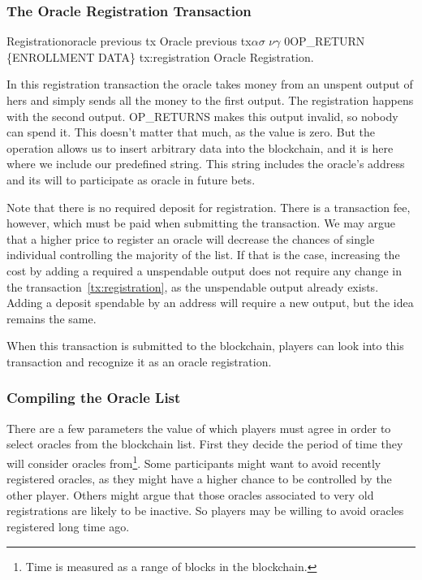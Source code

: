 \subsubsection{The Oracle Registration Transaction}

\transaction
    {Registration}{oracle previous tx}
      {Oracle previous tx}{$\alpha$}{$\sigma$}
      \stopinputs
      {$\nu$}{$\gamma$}
      {$0$}{OP\_RETURN \{ENROLLMENT DATA\}}
      \stopoutputs
      {tx:registration}
      {Oracle Registration.}

In this registration transaction the oracle takes money from an unspent output
  of hers and simply sends all the money to the first output.
The registration happens with the second output. OP\_RETURNS makes this output
  invalid, so nobody can spend it.
This doesn't matter that much, as the value is zero.
But the operation allows us to insert arbitrary data into the blockchain, and it
  is here where we include our predefined string. This string includes the
  oracle's address and its will to participate as oracle in future bets.

Note that there is no required deposit for registration. There is a
  transaction fee, however, which must be paid when submitting the transaction.
We may argue that a higher price to register an oracle will decrease the
  chances of single individual controlling the majority of the list.
If that is the case, increasing the cost by adding a required a unspendable
output does not require any change in the transaction~\ref{tx:registration},
  as the unspendable output already exists.
Adding a deposit spendable by an address will require a new output, but the
  idea remains the same.

When this transaction is submitted to the blockchain, players can look into
  this transaction and recognize it as an oracle registration.

\subsubsection{Compiling the Oracle List}

There are a few parameters the value of which players must agree in order to
  select oracles from the blockchain list.
First they decide the period of time they will consider oracles from\footnote{%
  Time is measured as a range of blocks in the blockchain.}.
Some participants might want to avoid recently registered oracles, as they might
  have a higher chance to be controlled by the other player.
Others might argue that those oracles associated to very old registrations
  are likely to be inactive.
So players may be willing to avoid oracles registered long time ago.

